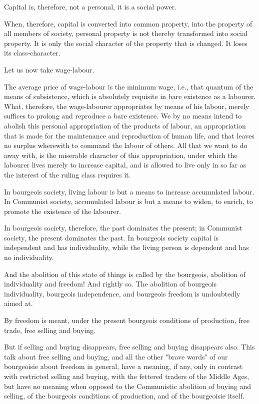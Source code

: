 \documentclass[11pt]{book}
\begin{document}
Capital is, therefore, not a personal, it is a social power.

When, therefore, capital is converted into common property, into
the property of all members of society, personal property is not
thereby transformed into social property. It is only the social
character of the property that is changed. It loses its
class-character.

Let us now take wage-labour.

The average price of wage-labour is the minimum wage, i.e.,
that quantum of the means of subsistence, which is absolutely
requisite in bare existence as a labourer.  What, therefore, the
wage-labourer appropriates by means of his labour, merely
suffices to prolong and reproduce a bare existence.  We by no
means intend to abolish this personal appropriation of the
products of labour, an appropriation that is made for the
maintenance and reproduction of human life, and that leaves no
surplus wherewith to command the labour of others.  All that we
want to do away with, is the miserable character of this
appropriation, under which the labourer lives merely to increase
capital, and is allowed to live only in so far as the interest of
the ruling class requires it.

In bourgeois society, living labour is but a means to increase
accumulated labour.  In Communist society, accumulated labour
is but a means to widen, to enrich, to promote the existence
of the labourer.

In bourgeois society, therefore, the past dominates the present;
in Communist society, the present dominates the past.  In
bourgeois society capital is independent and has individuality,
while the living person is dependent and has no individuality.

And the abolition of this state of things is called by the
bourgeois, abolition of individuality and freedom! And rightly
so. The abolition of bourgeois individuality, bourgeois
independence, and bourgeois freedom is undoubtedly aimed at.

By freedom is meant, under the present bourgeois conditions of
production, free trade, free selling and buying.

But if selling and buying disappears, free selling and buying
disappears also.  This talk about free selling and buying, and
all the other "brave words" of our bourgeoisie about freedom in
general, have a meaning, if any, only in contrast with restricted
selling and buying, with the fettered traders of the Middle Ages,
but have no meaning when opposed to the Communistic abolition of
buying and selling, of the bourgeois conditions of production,
and of the bourgeoisie itself.
\end{document}
